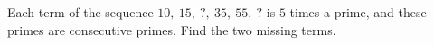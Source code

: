 Each term of the sequence $10,\ 15,\ ?,\ 35,\ 55,\ ?$ is $5$ times a prime, and these primes are consecutive primes. Find the two missing terms.
